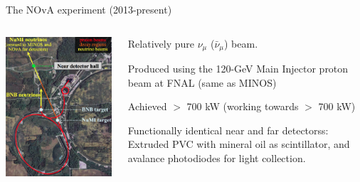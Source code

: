 \begin{frame}{The NOvA experiment (2013-present)}

\begin{columns}
  \begin{column}{0.45\textwidth}
     \includegraphics[width=0.99\textwidth]{./images/3nu/accelerator/nova_fnal}
  \end{column}
  \begin{column}{0.55\textwidth}
  \begin{itemize}
  {\scriptsize
    \item Relatively pure $\nu_{\mu}$ ($\bar{\nu}_{\mu}$) beam.
    \item Produced using the 120-GeV Main Injector proton beam at FNAL (same as MINOS)
    \item Achieved $>$ 700 kW (working towards $>$ 700 kW)
    \item Functionally identical near and far detectorss: Extruded PVC with mineral oil as scintillator,
    and avalance photodiodes for light collection.
}
\end{itemize}
\end{column}
\end{columns}
\end{frame}
